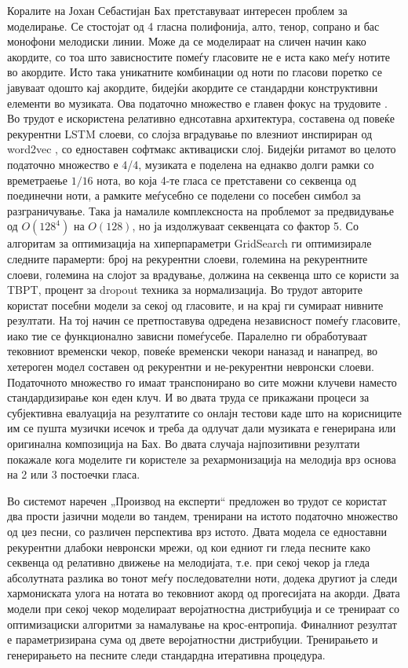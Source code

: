 Коралите на Јохан Себастијан Бах претставуваат интересен проблем за моделирање. Се стостојат од 4 гласна полифонија, алто, тенор, сопрано и бас монофони мелодиски линии. Може да се моделираат на сличен начин како акордите, со тоа што зависностите помеѓу гласовите не е иста како меѓу нотите во акордите. Исто така уникатните комбинации од ноти по гласови поретко се јавуваат одошто кај акордите, бидејќи акордите се стандардни конструктивни елементи во музиката. Ова податочно множество е главен фокус на трудовите \cite{Liang2017, Hadjeres2016}. Во трудот \cite{Liang2017} е искористена релативно еднсотавна архитектура, составена од повеќе рекурентни LSTM слоеви, со слојза вградување по влезниот инспириран од word2vec \cite{Herremans2017}, со едноставен софтмакс активациски слој. Бидејќи ритамот во целото податочно множество е 4/4, музиката е поделена на еднакво долги рамки со времетраење $1/16$ нота, во која 4-те гласа се претставени со секвенца од поединечни ноти, а рамките меѓусебно се поделени со посебен симбол за разграничување. Така ја намалиле комплексноста на проблемот за предвидување од $O(128^4)$ на $O(128)$, но ја издолжуваат секвенцата со фактор 5. Со алгоритам за оптимизација на хиперпараметри GridSearch ги оптимизирале следните парамерти: број на рекурентни слоеви, големина на рекурентните слоеви, големина на слојот за врадување, должина на секвенца што се користи за TBPT, процент за dropout техника за нормализација. Во трудот \cite{Hadjeres2016} авторите користат посебни модели за секој од гласовите, и на крај ги сумираат нивните резултати. На тој начин се претпоставува одредена независност помеѓу гласовите, иако тие се функционално зависни помеѓусебе. Паралелно ги обработуваат тековниот временски чекор, повеќе временски чекори наназад и нанапред, во хетероген модел составен од рекурентни и не-рекурентни невронски слоеви. Податочното множество го имаат транспонирано во сите можни клучеви наместо стандардизирање кон еден клуч. И во двата труда се прикажани процеси за субјективна евалуација на резултатите со онлајн тестови каде што на корисниците им се пушта музички исечок и треба да одлучат дали музиката е генерирана или оригинална композиција на Бах. Во двата случаја најпозитивни резултати покажале кога моделите ги користеле за рехармонизација на мелодија врз основа на 2 или 3 постоечки гласа.

Во системот наречен „Производ на експерти“ предложен во трудот \cite{Johnson2017} се користат два прости јазични модели во тандем, тренирани на истото податочно множество од џез песни, со различен перспектива врз истото. Двата модела се едноставни рекурентни длабоки невронски мрежи, од кои едниот ги гледа песните како секвенца од релативно движење на мелодијата, т.е. при секој чекор ја гледа абсолутната разлика во тонот меѓу последователни ноти, додека другиот ја следи хармониската улога на нотата во тековниот акорд од прогесијата на акорди. Двата модели при секој чекор моделираат веројатностна дистрибуција и се тренираат со оптимизациски алгоритми за намалување на крос-ентропија. Финалниот резултат е параметризирана сума од двете веројатностни дистрибуции. Тренирањето и генерирањето на песните следи стандардна итеративна процедура.

